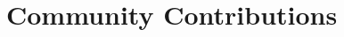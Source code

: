 \documentclass[]{resume-openfont}
\newcommand{\projectHeading}[3]{\Project{#1}{#2}
\descript{#3}\\}
\begin{document}

\sectionsep


\section{Community Contributions}
\end{document}
